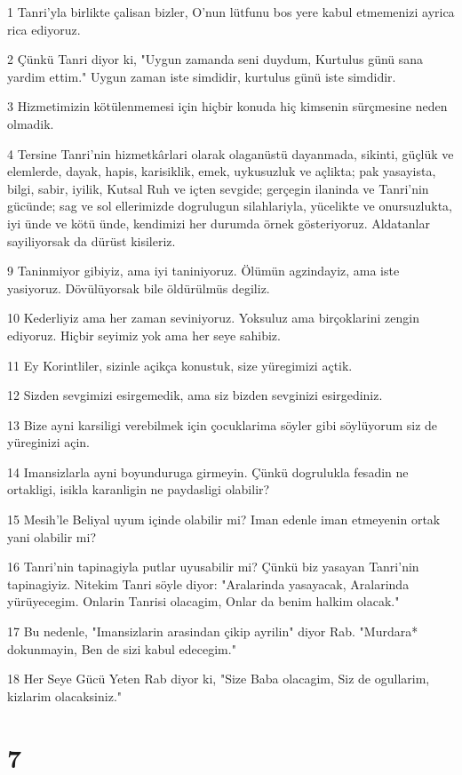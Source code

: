 \par 1 Tanri'yla birlikte çalisan bizler, O'nun lütfunu bos yere kabul etmemenizi ayrica rica ediyoruz.
\par 2 Çünkü Tanri diyor ki, "Uygun zamanda seni duydum, Kurtulus günü sana yardim ettim." Uygun zaman iste simdidir, kurtulus günü iste simdidir.
\par 3 Hizmetimizin kötülenmemesi için hiçbir konuda hiç kimsenin sürçmesine neden olmadik.
\par 4 Tersine Tanri'nin hizmetkârlari olarak olaganüstü dayanmada, sikinti, güçlük ve elemlerde, dayak, hapis, karisiklik, emek, uykusuzluk ve açlikta; pak yasayista, bilgi, sabir, iyilik, Kutsal Ruh ve içten sevgide; gerçegin ilaninda ve Tanri'nin gücünde; sag ve sol ellerimizde dogrulugun silahlariyla, yücelikte ve onursuzlukta, iyi ünde ve kötü ünde, kendimizi her durumda örnek gösteriyoruz. Aldatanlar sayiliyorsak da dürüst kisileriz.
\par 9 Taninmiyor gibiyiz, ama iyi taniniyoruz. Ölümün agzindayiz, ama iste yasiyoruz. Dövülüyorsak bile öldürülmüs degiliz.
\par 10 Kederliyiz ama her zaman seviniyoruz. Yoksuluz ama birçoklarini zengin ediyoruz. Hiçbir seyimiz yok ama her seye sahibiz.
\par 11 Ey Korintliler, sizinle açikça konustuk, size yüregimizi açtik.
\par 12 Sizden sevgimizi esirgemedik, ama siz bizden sevginizi esirgediniz.
\par 13 Bize ayni karsiligi verebilmek için çocuklarima söyler gibi söylüyorum siz de yüreginizi açin.
\par 14 Imansizlarla ayni boyunduruga girmeyin. Çünkü dogrulukla fesadin ne ortakligi, isikla karanligin ne paydasligi olabilir?
\par 15 Mesih'le Beliyal uyum içinde olabilir mi? Iman edenle iman etmeyenin ortak yani olabilir mi?
\par 16 Tanri'nin tapinagiyla putlar uyusabilir mi? Çünkü biz yasayan Tanri'nin tapinagiyiz. Nitekim Tanri söyle diyor: "Aralarinda yasayacak, Aralarinda yürüyecegim. Onlarin Tanrisi olacagim, Onlar da benim halkim olacak."
\par 17 Bu nedenle, "Imansizlarin arasindan çikip ayrilin" diyor Rab. "Murdara* dokunmayin, Ben de sizi kabul edecegim."
\par 18 Her Seye Gücü Yeten Rab diyor ki, "Size Baba olacagim, Siz de ogullarim, kizlarim olacaksiniz."

\chapter{7}

